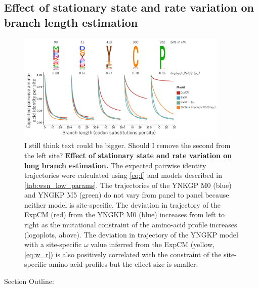 \documentclass[11pt]{article}
\newcommand\skhcomment[1]{{\color{cyan}#1}}
\newcommand\jdbcomment[1]{{\color{red}#1}}
\begin{document}
\subsection*{Effect of stationary state and rate variation on branch length estimation}

\begin{figure}[H]
\centerline{\includegraphics[width=0.90\textwidth]{figures/decay.pdf}}
\caption{\label{fig:decay}
\jdbcomment{I still think text could be bigger.}
\skhcomment{Should I remove the second from the left site?}
\textbf{Effect of stationary state and rate variation on long branch estimation.}
The expected pairwise identity trajectories were calculated using \ref{eq:f} and models described in \ref{tab:wsn_low_params}.
The trajectories of the YNKGP M0 (blue) and YNGKP M5 (green) do not vary from panel to panel because neither model is site-specific. 
The deviation in trajectory of the ExpCM (red) from the YNGKP M0 (blue) increases from left to right as the mutational constraint of the amino-acid profile increases (logoplots, above). 
The deviation in trajectory of the YNGKP model with a site-specific $\omega$ value inferred from the ExpCM (yellow, \ref{eq:w_r}) is also positively correlated with the constraint of the site-specific amino-acid profiles but the effect size is smaller. 
}
\end{figure}

\skhcomment{Section Outline:}
\end{document}
